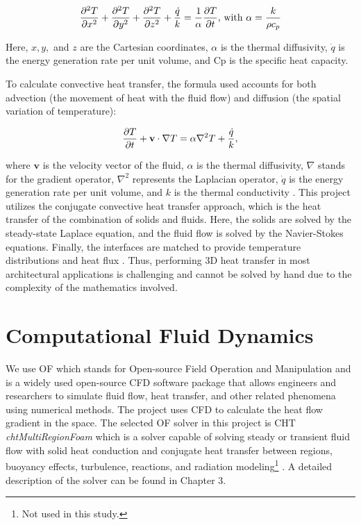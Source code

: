 	\begin{equation} 
	\frac{\partial^2 T}{\partial x^2}+
	\frac{\partial^2 T}{\partial y^2}+
	\frac{\partial^2 T}{\partial z^2}+ 
	\frac{\dot{q}}{k}= \frac{1}{\alpha}\frac{\partial T}{\partial t} \text{, with } \alpha = \frac{k}{\rho c_p}\quad \\
	\end{equation}
	
	
Here, $x,y,$ and $z$ are the Cartesian coordinates, $\alpha$ is the thermal diffusivity, $\dot{q}$ is the energy generation rate per unit volume, and \gls{Cp} is the specific heat capacity.
 
To calculate convective heat transfer, the formula used accounts for both advection (the movement of heat with the fluid flow) and diffusion (the spatial variation of temperature): 

\begin{equation}
    \frac{\partial T}{\partial t} + \vb v \cdot \nabla T = \alpha \nabla^2 T + \frac{\dot{q}}{k},
\end{equation}

where $\mathbf{v}$ is the velocity vector of the fluid, $\alpha$ is the thermal diffusivity, $\nabla$ stands for the gradient operator, $\nabla^2$ represents the Laplacian operator, $\dot{q}$ is the energy generation rate per unit volume, and $k$ is the thermal conductivity \cite{bergman2011fundamentals}. This project utilizes the conjugate convective heat transfer approach, which is the heat transfer of the combination of solids and fluids. Here, the solids are solved by the steady-state Laplace equation, and the fluid flow is solved by the Navier-Stokes equations. Finally, the interfaces are matched to provide temperature distributions and heat flux \cite{Zhao2007}. Thus, performing 3D heat transfer in most architectural applications is challenging and cannot be solved by hand due to the complexity of the mathematics involved.



\section{Computational Fluid Dynamics}
We use \gls{OF} which stands for Open-source Field Operation and Manipulation and is a widely used open-source \gls{CFD} software package that allows engineers and researchers to simulate fluid flow, heat transfer, and other related phenomena using numerical methods. The project uses \gls{CFD} to calculate the heat flow gradient in the space. The selected \gls{OF} solver in this project is \gls{CHT} \textit{chtMultiRegionFoam} which is a solver capable of solving steady or transient fluid flow with solid heat conduction and conjugate heat transfer between regions, buoyancy effects, turbulence, reactions, and radiation modeling\footnote{Not used in this study.} \cite{cht}. A detailed description of the solver can be found in Chapter 3.


